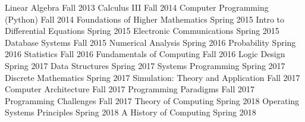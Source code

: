 \begin{cvskills}
\cvskill
  {Linear Algebra}
  {Fall 2013}
\cvskill
  {Calculus III}
  {Fall 2014}
\cvskill
  {Computer Programming (Python)}
  {Fall 2014}
\cvskill
  {Foundations of Higher Mathematics}
  {Spring 2015}
\cvskill
  {Intro to Differential Equations}
  {Spring 2015}
\cvskill
  {Electronic Communications}
  {Spring 2015}
\cvskill
  {Database Systems}
  {Fall 2015}
\cvskill
  {Numerical Analysis}
  {Spring 2016}
\cvskill
  {Probability}
  {Spring 2016}
\cvskill
  {Statistics}
  {Fall 2016}
\cvskill
  {Fundamentals of Computing}
  {Fall 2016}
\cvskill
  {Logic Design}
  {Spring 2017}
\cvskill
  {Data Structures}
  {Spring 2017}
\cvskill
  {Systems Programming}
  {Spring 2017}
\cvskill
  {Discrete Mathematics}
  {Spring 2017}
\cvskill
  {Simulation: Theory and Application}
  {Fall 2017}
\cvskill
  {Computer Architecture}
  {Fall 2017}
\cvskill
  {Programming Paradigms}
  {Fall 2017}
\cvskill
  {Programming Challenges}
  {Fall 2017}
\cvskill
  {Theory of Computing}
  {Spring 2018}
\cvskill
  {Operating Systems Principles}
  {Spring 2018}
\cvskill
  {A History of Computing}
  {Spring 2018}
\end{cvskills}
